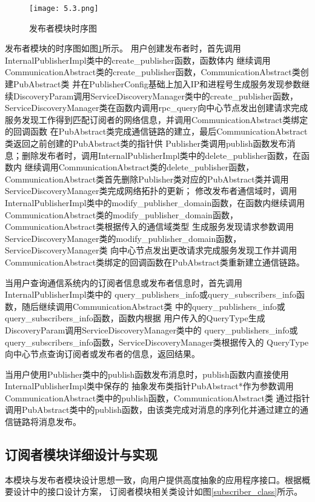 \begin{figure}[htb]
  \centering
  \texttt{[image: 5.3.png]}
  \caption{发布者模块时序图}
  \label{publisher_timesequence}
\end{figure}

发布者模块的时序图如图\ref{publisher_timesequence}所示。
用户创建发布者时，首先调用InternalPublisherImpl类中的create\_publisher函数，函数体内
继续调用CommunicationAbstract类的create\_publisher函数，CommunicationAbstract类创建PubAbstract类
并在PublisherConfig基础上加入IP和进程号生成服务发现参数继续DiscoveryParam调用ServiceDiscoveryManager类中的create\_publisher函数，
ServiceDiscoveryManager类在函数内调用rpc\_query向中心节点发出创建请求完成服务发现工作得到匹配订阅者的网络信息，并调用CommunicationAbstract类绑定的回调函数
在PubAbstract类完成通信链路的建立，最后CommunicationAbstract类返回之前创建的PubAbstract类的指针供
Publisher类调用publish函数发布消息；删除发布者时，调用InternalPublisherImpl类中的delete\_publisher函数，在函数内
继续调用CommunicationAbstract类的delete\_publisher函数，
CommunicationAbstract类首先删除Publisher类对应的PubAbstract类并调用ServiceDiscoveryManager类完成网络拓扑的更新；
修改发布者通信域时，调用InternalPublisherImpl类中的modify\_publisher\_domain函数，在函数内继续调用
CommunicationAbstract类的modify\_publisher\_domain函数，CommunicationAbstract类根据传入的通信域类型
生成服务发现请求参数调用ServiceDiscoveryManager类的modify\_publisher\_domain函数，ServiceDiscoveryManager类
向中心节点发出更改请求完成服务发现工作并调用CommunicationAbstract类绑定的回调函数在PubAbstract类重新建立通信链路。

当用户查询通信系统内的订阅者信息或发布者信息时，首先调用InternalPublisherImpl类中的
query\_publishers\_info或query\_subscribers\_info函数，随后继续调用CommunicationAbstract类
中的query\_publishers\_info或query\_subscribers\_info函数，函数内根据
用户传入的QueryType生成DiscoveryParam调用ServiceDiscoveryManager类中的
query\_publishers\_info或query\_subscribers\_info函数，ServiceDiscoveryManager类根据传入的
QueryType向中心节点查询订阅者或发布者的信息，返回结果。

当用户使用Publisher类中的publish函数发布消息时，publish函数内直接使用InternalPublisherImpl类中保存的
抽象发布类指针PubAbstract*作为参数调用CommunicationAbstract类中的publish函数，CommunicationAbstract类
通过指针调用PubAbstract类中的publish函数，由该类完成对消息的序列化并通过建立的通信链路将消息发布。

\subsection{订阅者模块详细设计与实现}
本模块与发布者模块设计思想一致，向用户提供高度抽象的应用程序接口。根据概要设计中的接口设计方案，
订阅者模块相关类设计如图\ref{subscriber_class}所示。

